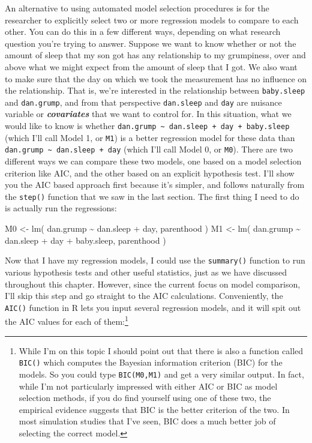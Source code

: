 \documentclass[
]{book}
\newenvironment{Shaded}{\begin{snugshade}}{\end{snugshade}}
\newcommand{\FunctionTok}[1]{\textcolor[rgb]{0.00,0.00,0.00}{#1}}
\newcommand{\NormalTok}[1]{#1}
\newcommand{\OtherTok}[1]{\textcolor[rgb]{0.56,0.35,0.01}{#1}}
\newcommand{\SpecialCharTok}[1]{\textcolor[rgb]{0.00,0.00,0.00}{#1}}
\begin{document}
An alternative to using automated model selection procedures is for the researcher to explicitly select two or more regression models to compare to each other. You can do this in a few different ways, depending on what research question you're trying to answer. Suppose we want to know whether or not the amount of sleep that my son got has any relationship to my grumpiness, over and above what we might expect from the amount of sleep that I got. We also want to make sure that the day on which we took the measurement has no influence on the relationship. That is, we're interested in the relationship between \texttt{baby.sleep} and \texttt{dan.grump}, and from that perspective \texttt{dan.sleep} and \texttt{day} are nuisance variable or \textbf{\emph{covariates}} that we want to control for. In this situation, what we would like to know is whether \texttt{dan.grump\ \textasciitilde{}\ dan.sleep\ +\ day\ +\ baby.sleep} (which I'll call Model 1, or \texttt{M1}) is a better regression model for these data than \texttt{dan.grump\ \textasciitilde{}\ dan.sleep\ +\ day} (which I'll call Model 0, or \texttt{M0}). There are two different ways we can compare these two models, one based on a model selection criterion like AIC, and the other based on an explicit hypothesis test. I'll show you the AIC based approach first because it's simpler, and follows naturally from the \texttt{step()} function that we saw in the last section. The first thing I need to do is actually run the regressions:

\begin{Shaded}
\begin{Highlighting}[]
\NormalTok{M0 }\OtherTok{\textless{}{-}} \FunctionTok{lm}\NormalTok{( dan.grump }\SpecialCharTok{\textasciitilde{}}\NormalTok{ dan.sleep }\SpecialCharTok{+}\NormalTok{ day, parenthood )}
\NormalTok{M1 }\OtherTok{\textless{}{-}} \FunctionTok{lm}\NormalTok{( dan.grump }\SpecialCharTok{\textasciitilde{}}\NormalTok{ dan.sleep }\SpecialCharTok{+}\NormalTok{ day }\SpecialCharTok{+}\NormalTok{ baby.sleep, parenthood )}
\end{Highlighting}
\end{Shaded}

Now that I have my regression models, I could use the \texttt{summary()} function to run various hypothesis tests and other useful statistics, just as we have discussed throughout this chapter. However, since the current focus on model comparison, I'll skip this step and go straight to the AIC calculations. Conveniently, the \texttt{AIC()} function in R lets you input several regression models, and it will spit out the AIC values for each of them:\footnote{While I'm on this topic I should point out that there is also a function called \texttt{BIC()} which computes the Bayesian information criterion (BIC) for the models. So you could type \texttt{BIC(M0,M1)} and get a very similar output. In fact, while I'm not particularly impressed with either AIC or BIC as model selection methods, if you do find yourself using one of these two, the empirical evidence suggests that BIC is the better criterion of the two. In most simulation studies that I've seen, BIC does a much better job of selecting the correct model.}
\end{document}
